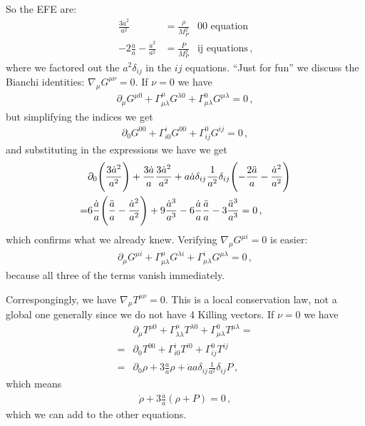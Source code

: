 \documentclass[main.tex]{subfiles}
\begin{document}
So the EFE are: 
%
\begin{align}
  \frac{3 \dot{a}^2}{a^2} &= \frac{\rho }{M_P^2}  & \text{00 equation}\\
  - 2 \frac{\ddot{a}}{a} - \frac{\dot{a}^2}{a^2} &=
  \frac{P}{M_P^2} & \text{ij equations}
\,,
\end{align}
%
where we factored out the \(a^2 \delta_{ij}\) in the \(ij\) equations. 
``Just for fun'' we discuss the Bianchi identities: \(\nabla_{\mu } G^{\mu \nu }=0\). 
If \(\nu =0\) we have 
%
\begin{align}
  \partial_{\mu } G^{\mu 0} + \Gamma^{\mu }_{\mu \lambda } G^{\lambda 0} + \Gamma^{0}_{\mu \lambda } G^{\mu \lambda } = 0
\,,
\end{align}
%
but simplifying the indices we get 
%
\begin{align}
  \partial_{0} G^{00} + \Gamma^{i}_{i0} G^{00} + \Gamma^{0}_{ij} G^{ij} =0
\,,
\end{align}
%
and substituting in the expressions we have we get 
%
\begin{align}
  &\partial_{0} \qty(\frac{3 \dot{a}^2}{a^2})
  + \frac{3 \dot{a}}{a} \frac{3 \dot{a}^2}{a^2}
  + a \dot{a} \delta_{ij} \frac{1}{a^2} \delta_{ij}
  \qty(- \frac{2 \ddot{a}}{a} - \frac{\dot{a}^2}{a^2}) \\
  = & 6 \frac{\dot{a}}{a} \qty(\frac{\ddot{a}}{a} - \frac{\dot{a}^2}{a^2})
  + 9 \frac{\dot{a}^3}{a^3} - 6 \frac{\dot{a}}{a} \frac{\ddot{a}}{a} - 3 \frac{\ddot{a}^3}{a^3} = 0 
\,,
\end{align}
%
which confirms what we already knew. Verifying \(\nabla_{\mu} G^{\mu i } = 0\) is easier:  
%
\begin{align}
    \partial_{\mu } G^{\mu i} + \Gamma^{\mu }_{\mu \lambda } G^{\lambda i} + \Gamma^{i}_{\mu \lambda } G^{\mu \lambda } = 0
\,,
\end{align}
%
because all three of the terms vanish immediately. 

Correspongingly, we have \(\nabla_{\mu } T^{\mu \nu } =0 \). 
This is a local conservation law, not a global one generally since we do not have 4 Killing vectors. 
If \(\nu =0\) we have 
%
\begin{align}
  &\partial_{\mu } T^{\mu 0} + \Gamma^{\mu }_{\lambda \lambda  } T^{\lambda 0} + \Gamma^{0}_{\mu \lambda } T^{\mu \lambda } = \\
  =& \partial_{0} T^{00} +
  \Gamma^{i}_{i0} T^{i0} + \Gamma^{0}_{ij} T^{ij} \\
  =& \partial_{0} \rho 
+ 3 \frac{\dot{a}}{a} \rho + \dot{a} a \delta_{ij} \frac{1}{a^2} \delta_{ij} P 
\,,
\end{align}
%
which means 
%
\begin{align}
  \dot{\rho} + 3 \frac{\dot{a}}{a} ( \rho +P) = 0
\,,
\end{align}
%
which we can add to the other equations. 
\end{document}
